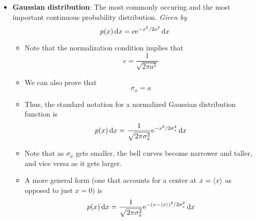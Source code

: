\documentclass[../notes.tex]{subfiles}
\begin{document}
\begin{itemize}
    \item \textbf{Gaussian distribution}: The most commonly occuring and the most important continuous probability distribution. \emph{Given by}
    \begin{equation*}
        p(x)\dd{x} = c\e[-x^2/2a^2]\dd{x}
    \end{equation*}
    \begin{itemize}
        \item Note that the normalization condition implies that
        \begin{equation*}
            c = \frac{1}{\sqrt{2\pi a^2}}
        \end{equation*}
        \item We can also prove that
        \begin{equation*}
            \sigma_x = a
        \end{equation*}
        \item Thus, the standard notation for a normalized Gaussian distribution function is
        \begin{equation*}
            p(x)\dd{x} = \frac{1}{\sqrt{2\pi\sigma_x^2}}\e[-x^2/2\sigma_x^2]\dd{x}
        \end{equation*}
        \item Note that as $\sigma_x$ gets smaller, the bell curves become narrower and taller, and vice versa as it gets larger.
        \item A more general form (one that accounts for a center at $x=\prb{x}$ as opposed to just $x=0$) is
        \begin{equation*}
            p(x)\dd{x} = \frac{1}{\sqrt{2\pi\sigma_x^2}}\e[-(x-\prb{x})^2/2\sigma_x^2]\dd{x}
        \end{equation*}
    \end{itemize}
\end{itemize}
\end{document}
